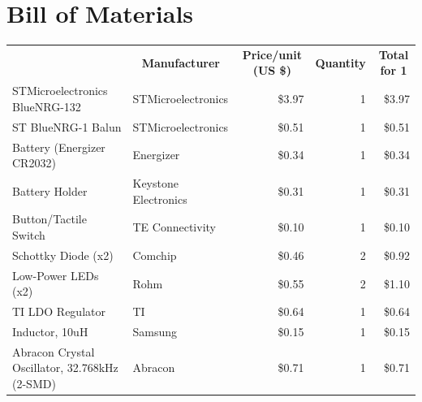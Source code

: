 \documentclass[journal,compsoc]{IEEEtran}
\begin{document}
\section{Bill of Materials}
\onecolumn
\begin{table}[]
  \centering
    \begin{tabular}{|rrr|r|r|}
    \toprule
    \rowcolor[rgb]{ .663,  .816,  .557} \multicolumn{5}{|c|}{\textbf{Button}} \\
    \midrule
    \rowcolor[rgb]{ .608,  .761,  .902} \multicolumn{1}{|c|}{\textbf{Component}} & \multicolumn{1}{c|}{\textbf{Manufacturer}} & \multicolumn{1}{c|}{\textbf{Price/unit (US \$)}} & \multicolumn{1}{c|}{\textbf{Quantity}} & \multicolumn{1}{c|}{\textbf{Total for 1}} \\
    \midrule
    \multicolumn{1}{|l}{STMicroelectronics BlueNRG-132} & \multicolumn{1}{l}{STMicroelectronics} & \multicolumn{1}{r}{\$3.97 } & \multicolumn{1}{r}{1} & \$3.97 \\
    \multicolumn{1}{|l}{ST BlueNRG-1 Balun} & \multicolumn{1}{l}{STMicroelectronics} & \multicolumn{1}{r}{\$0.51 } & \multicolumn{1}{r}{1} & \$0.51 \\
    \multicolumn{1}{|l}{Battery (Energizer CR2032)} & \multicolumn{1}{l}{Energizer} & \multicolumn{1}{r}{\$0.34 } & \multicolumn{1}{r}{1} & \$0.34 \\
    \multicolumn{1}{|l}{Battery Holder} & \multicolumn{1}{l}{Keystone Electronics} & \multicolumn{1}{r}{\$0.31 } & \multicolumn{1}{r}{1} & \$0.31 \\
    \multicolumn{1}{|l}{Button/Tactile Switch} & \multicolumn{1}{l}{TE Connectivity} & \multicolumn{1}{r}{\$0.10 } & \multicolumn{1}{r}{1} & \$0.10 \\
    \multicolumn{1}{|l}{Schottky Diode (x2)} & \multicolumn{1}{l}{Comchip} & \multicolumn{1}{r}{\$0.46 } & \multicolumn{1}{r}{2} & \$0.92 \\
    \multicolumn{1}{|l}{Low-Power LEDs (x2)} & \multicolumn{1}{l}{Rohm} & \multicolumn{1}{r}{\$0.55 } & \multicolumn{1}{r}{2} & \$1.10 \\
    \multicolumn{1}{|l}{TI LDO Regulator} & \multicolumn{1}{l}{TI} & \multicolumn{1}{r}{\$0.64 } & \multicolumn{1}{r}{1} & \$0.64 \\
    \multicolumn{1}{|l}{Inductor, 10uH} & \multicolumn{1}{l}{Samsung} & \multicolumn{1}{r}{\$0.15 } & \multicolumn{1}{r}{1} & \$0.15 \\
    \multicolumn{1}{|l}{Abracon Crystal Oscillator, 32.768kHz (2-SMD)} & \multicolumn{1}{l}{Abracon} & \multicolumn{1}{r}{\$0.71 } & \multicolumn{1}{r}{1} & \$0.71 \\

\end{tabular}
\end{table}
\end{document}
